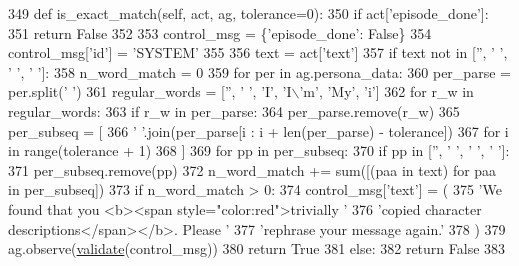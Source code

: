\begin{DoxyCode}
349     \textcolor{keyword}{def }is\_exact\_match(self, act, ag, tolerance=0):
350         \textcolor{keywordflow}{if} act[\textcolor{stringliteral}{'episode\_done'}]:
351             \textcolor{keywordflow}{return} \textcolor{keyword}{False}
352 
353         control\_msg = \{\textcolor{stringliteral}{'episode\_done'}: \textcolor{keyword}{False}\}
354         control\_msg[\textcolor{stringliteral}{'id'}] = \textcolor{stringliteral}{'SYSTEM'}
355 
356         text = act[\textcolor{stringliteral}{'text'}]
357         \textcolor{keywordflow}{if} text \textcolor{keywordflow}{not} \textcolor{keywordflow}{in} [\textcolor{stringliteral}{''}, \textcolor{stringliteral}{' '}, \textcolor{stringliteral}{'  '}, \textcolor{stringliteral}{'   '}]:
358             n\_word\_match = 0
359             \textcolor{keywordflow}{for} per \textcolor{keywordflow}{in} ag.persona\_data:
360                 per\_parse = per.split(\textcolor{stringliteral}{' '})
361                 regular\_words = [\textcolor{stringliteral}{''}, \textcolor{stringliteral}{' '}, \textcolor{stringliteral}{'I'}, \textcolor{stringliteral}{'I\(\backslash\)'m'}, \textcolor{stringliteral}{'My'}, \textcolor{stringliteral}{'i'}]
362                 \textcolor{keywordflow}{for} r\_w \textcolor{keywordflow}{in} regular\_words:
363                     \textcolor{keywordflow}{if} r\_w \textcolor{keywordflow}{in} per\_parse:
364                         per\_parse.remove(r\_w)
365                 per\_subseq = [
366                     \textcolor{stringliteral}{' '}.join(per\_parse[i : i + len(per\_parse) - tolerance])
367                     \textcolor{keywordflow}{for} i \textcolor{keywordflow}{in} range(tolerance + 1)
368                 ]
369                 \textcolor{keywordflow}{for} pp \textcolor{keywordflow}{in} per\_subseq:
370                     \textcolor{keywordflow}{if} pp \textcolor{keywordflow}{in} [\textcolor{stringliteral}{''}, \textcolor{stringliteral}{' '}, \textcolor{stringliteral}{'  '}, \textcolor{stringliteral}{'   '}]:
371                         per\_subseq.remove(pp)
372                 n\_word\_match += sum([(paa \textcolor{keywordflow}{in} text) \textcolor{keywordflow}{for} paa \textcolor{keywordflow}{in} per\_subseq])
373             \textcolor{keywordflow}{if} n\_word\_match > 0:
374                 control\_msg[\textcolor{stringliteral}{'text'}] = (
375                     \textcolor{stringliteral}{'We found that you <b><span style="color:red">trivially '}
376                     \textcolor{stringliteral}{'copied character descriptions</span></b>. Please '}
377                     \textcolor{stringliteral}{'rephrase your message again.'}
378                 )
379                 ag.observe(\hyperlink{namespaceparlai_1_1core_1_1worlds_afc3fad603b7bce41dbdc9cdc04a9c794}{validate}(control\_msg))
380                 \textcolor{keywordflow}{return} \textcolor{keyword}{True}
381             \textcolor{keywordflow}{else}:
382                 \textcolor{keywordflow}{return} \textcolor{keyword}{False}
383 
\end{DoxyCode}

